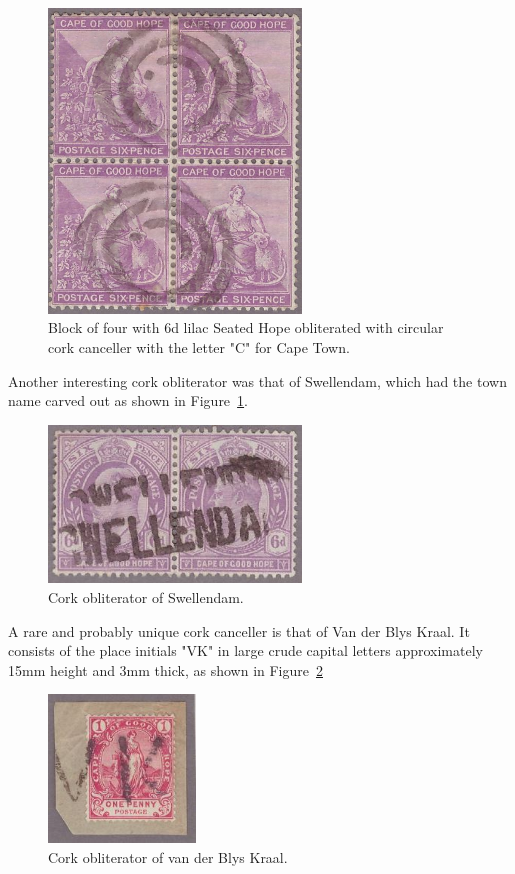 \begin{figure}
\includegraphics[width=0.6\textwidth]{../cape-of-good-hope/cork-cape-town.jpg}
\caption{Block of four with 6d lilac Seated Hope obliterated with circular cork canceller with the letter "C" for Cape Town.}
\end{figure}

Another interesting cork obliterator was that of Swellendam, which had the town name carved out as shown in Figure~\ref{swellendam}. 

\begin{figure}
\includegraphics[width=0.6\textwidth]{../cape-of-good-hope/cork-swellendam.jpg}
\caption{Cork obliterator of Swellendam.}
\label{swellendam}
\end{figure}

A rare and probably unique cork canceller is that of Van der Blys Kraal. It consists of the place initials "VK" in large crude capital letters approximately 15mm height and 3mm thick, as shown in Figure~\ref{blyskraal}

\begin{figure}
\includegraphics[width=0.35\textwidth]{../cape-of-good-hope/cork-blys.jpg}
\caption{Cork obliterator of van der Blys Kraal.}
\label{blyskraal}
\end{figure}

